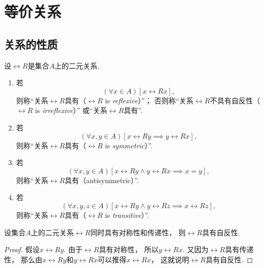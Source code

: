 \section{等价关系}
\subsection{关系的性质}
\begin{definition}
设\(\rel{R}\)是集合\(A\)上的二元关系.
\begin{enumerate}
	\item 若\[
		(\forall x \in A)
		[x\rel{R}x],
	\]
	则称“关系\(\rel{R}\)具有（\(\rel{R}\) is \emph{reflexive}）”；
	否则称“关系\(\rel{R}\)不具有自反性（\(\rel{R}\) is \emph{irreflexive}）”
	或“关系\(\rel{R}\)具有”.

	\item 若\[
		(\forall x,y \in A)
		[x\rel{R}y \implies y\rel{R}x],
	\]
	则称“关系\(\rel{R}\)具有（\(\rel{R}\) is \emph{symmetric}）”.

	\item 若\[
		(\forall x,y \in A)
		[x\rel{R}y \land y\rel{R}x \implies x = y],
	\]
	则称“关系\(\rel{R}\)具有（antisymmetric）”.

	\item 若\[
		(\forall x,y,z \in A)
		[x\rel{R}y \land y\rel{R}z \implies x\rel{R}z],
	\]
	则称“关系\(\rel{R}\)具有（\(\rel{R}\) is \emph{transitive}）”.
\end{enumerate}
\end{definition}

\begin{proposition}
设集合\(A\)上的二元关系\(\rel{R}\)同时具有对称性和传递性，
则\(\rel{R}\)具有自反性.
\begin{proof}
假设\(x\rel{R}y\).
由于\(\rel{R}\)具有对称性，
所以\(y\rel{R}x\).
又因为\(\rel{R}\)具有传递性，
那么由\(x\rel{R}y\)和\(y\rel{R}x\)可以推得\(x\rel{R}x\)，
这就说明\(\rel{R}\)具有自反性.
\end{proof}
\end{proposition}

